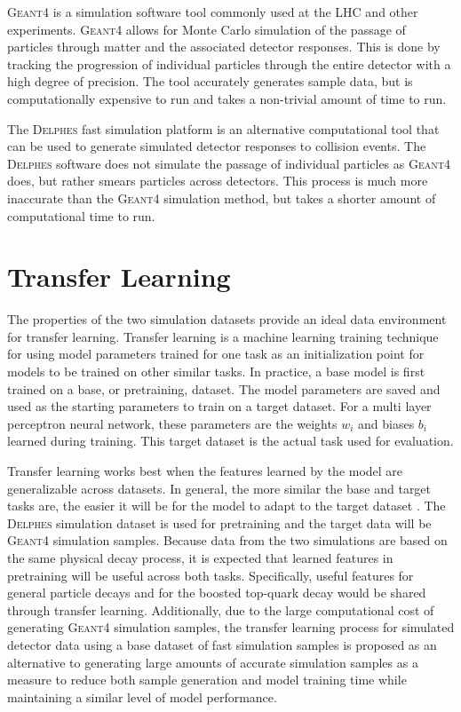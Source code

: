 \textsc{Geant4} is a simulation software tool commonly used at the LHC and other experiments. \textsc{Geant4} allows for Monte Carlo simulation of the passage of particles through matter and the associated detector responses. This is done by tracking the progression of individual particles through the entire detector with a high degree of precision. The tool accurately generates sample data, but is computationally expensive to run and takes a non-trivial amount of time to run.

The \textsc{Delphes} fast simulation platform is an alternative computational tool that can be used to generate simulated detector responses to collision events. The \textsc{Delphes} software does not simulate the passage of individual particles as \textsc{Geant4} does, but rather smears particles across detectors. This process is much more inaccurate than the \textsc{Geant4} simulation method, but takes a shorter amount of computational time to run.

\section{Transfer Learning}

The properties of the two simulation datasets provide an ideal data environment for transfer learning. Transfer learning is a machine learning training technique for using model parameters trained for one task as an initialization point for models to be trained on other similar tasks. In practice, a base model is first trained on a base, or pretraining, dataset. The model parameters are saved and used as the starting parameters to train on a target dataset. For a multi layer perceptron neural network, these parameters are the weights $w_i$ and biases $b_i$ learned during training. This target dataset is the actual task used for evaluation.

Transfer learning works best when the features learned by the model are generalizable across datasets. In general, the more similar the base and target tasks are, the easier it will be for the model to adapt to the target dataset \cite{yosinski2014transferable}. The \textsc{Delphes} simulation dataset is used for pretraining and the target data will be \textsc{Geant4} simulation samples. Because data from the two simulations are based on the same physical decay process, it is expected that learned features in pretraining will be useful across both tasks. Specifically, useful features for general particle decays and for the boosted top-quark decay would be shared through transfer learning. Additionally, due to the large computational cost of generating \textsc{Geant4} simulation samples, the transfer learning process for simulated detector data using a base dataset of fast simulation samples is proposed as an alternative to generating large amounts of accurate simulation samples as a measure to reduce both sample generation and model training time while maintaining a similar level of model performance.
